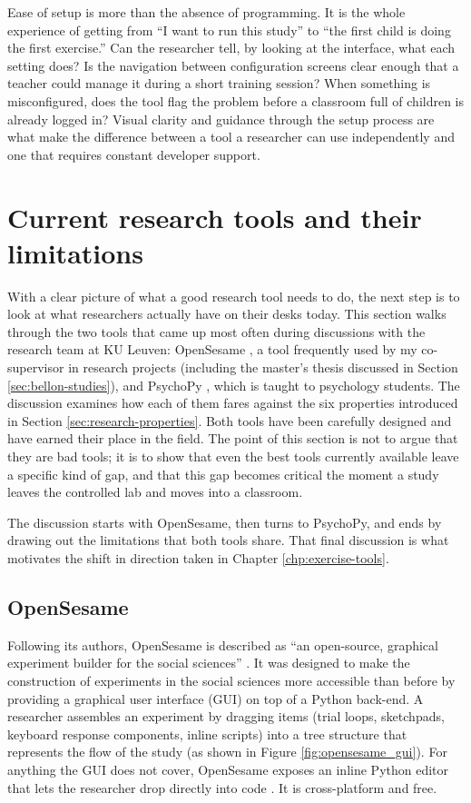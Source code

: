 Ease of setup is more than the absence of programming. It is the whole experience of getting from ``I want to run this study'' to ``the first child is doing the first exercise.'' Can the researcher tell, by looking at the interface, what each setting does? Is the navigation between configuration screens clear enough that a teacher could manage it during a short training session? When something is misconfigured, does the tool flag the problem before a classroom full of children is already logged in? Visual clarity and guidance through the setup process are what make the difference between a tool a researcher can use independently and one that requires constant developer support.

\section{Current research tools and their limitations}
\label{sec:research-tools}
With a clear picture of what a good research tool needs to do, the next step is to look at what researchers actually have on their desks today. This section walks through the two tools that came up most often during discussions with the research team at KU Leuven: OpenSesame \cite{mathot_opensesame_2012}, a tool frequently used by my co-supervisor in research projects (including the master's thesis discussed in Section \ref{sec:bellon-studies}), and PsychoPy \cite{peirce2019psychopy2}, which is taught to psychology students. The discussion examines how each of them fares against the six properties introduced in Section \ref{sec:research-properties}. Both tools have been carefully designed and have earned their place in the field. The point of this section is not to argue that they are bad tools; it is to show that even the best tools currently available leave a specific kind of gap, and that this gap becomes critical the moment a study leaves the controlled lab and moves into a classroom.

The discussion starts with OpenSesame, then turns to PsychoPy, and ends by drawing out the limitations that both tools share. That final discussion is what motivates the shift in direction taken in Chapter \ref{chp:exercise-tools}.

\subsection{OpenSesame}
Following its authors, OpenSesame is described as ``an open-source, graphical experiment builder for the social sciences'' \cite{mathot_opensesame_2012}. It was designed to make the construction of experiments in the social sciences more accessible than before by providing a graphical user interface (GUI) on top of a Python back-end. A researcher assembles an experiment by dragging items (trial loops, sketchpads, keyboard response components, inline scripts) into a tree structure that represents the flow of the study (as shown in Figure \ref{fig:opensesame_gui}). For anything the GUI does not cover, OpenSesame exposes an inline Python editor that lets the researcher drop directly into code \cite{mathot_opensesame_2012}. It is cross-platform and free.

